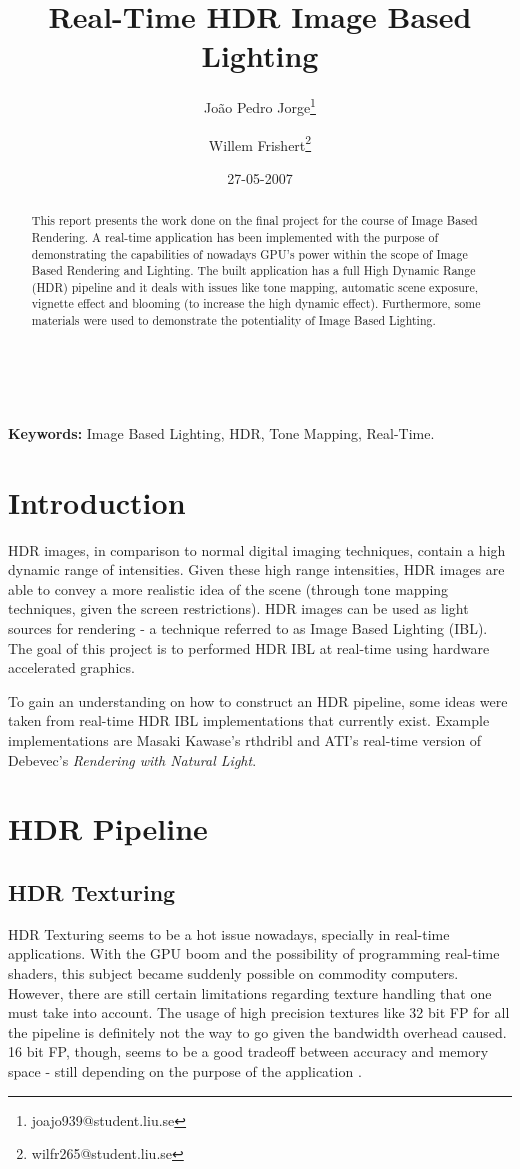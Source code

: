 \documentclass[twocolumn,8pt]{article}
\title{Real-Time HDR Image Based Lighting}
\author{Jo\~{a}o Pedro Jorge\thanks{joajo939@student.liu.se} \and Willem Frishert\thanks{wilfr265@student.liu.se}}
\date{27-05-2007}
\begin{document}
\small

\maketitle
\begin{abstract}
This report presents the work done on the final project for the course of Image Based Rendering. A real-time application has been implemented with the purpose of demonstrating the capabilities of nowadays GPU's power within the scope of Image Based Rendering and Lighting. The built application has a full High Dynamic Range (HDR) pipeline and it deals with issues like tone mapping, automatic scene exposure, vignette effect and blooming (to increase the high dynamic effect). Furthermore, some materials were used to demonstrate the potentiality of Image Based Lighting.
\end{abstract}
\\ \\
{\bf Keywords:}
Image Based Lighting, HDR, Tone Mapping, Real-Time.

\section{Introduction}
HDR images, in comparison to normal digital imaging techniques, contain a high dynamic range of intensities. Given these high range intensities, HDR images are able to convey a more realistic idea of the scene (through tone mapping techniques, given the screen restrictions). HDR images can be used as light sources for rendering - a technique referred to as Image Based Lighting (IBL). The goal of this project is to performed HDR IBL at real-time using hardware accelerated graphics.

To gain an understanding on how to construct an HDR pipeline, some ideas were taken from real-time HDR IBL implementations that currently exist. Example implementations are Masaki Kawase's rthdribl and ATI's real-time version of Debevec's {\it Rendering with Natural Light}. 

\section{HDR Pipeline}

\subsection{HDR Texturing}

HDR Texturing seems to be a hot issue nowadays, specially in real-time applications. With the GPU boom and the possibility of programming real-time shaders, this subject became suddenly possible on commodity computers. However, there are still certain limitations regarding texture handling that one must take into account. The usage of high precision textures like 32 bit FP for all the pipeline is definitely not the way to go given the bandwidth overhead caused. 16 bit FP, though, seems to be a good tradeoff between accuracy and memory space - still depending on the purpose of the application \cite{hdrTexturing}.
\end{document}
